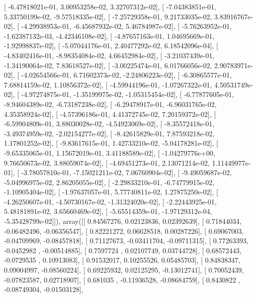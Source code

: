 \documentclass{article}
\begin{document}
       [ -6.47818021e-01,   3.00953258e-02,   3.32707312e-02],
       [ -7.04383851e-01,   5.33750199e-02,  -9.57518335e-02],
       [ -7.25729358e-01,   9.21733035e-02,   3.83916767e-02],
       [ -4.29938953e-01,  -6.45687932e-02,   5.46784987e-02],
       [ -5.76263952e-01,  -1.62387132e-03,  -4.42346108e-02],
       [ -4.87657163e-01,   1.04695669e-01,  -1.92998837e-02],
       [ -5.07044176e-01,   2.40477292e-02,   6.18542096e-04],
       [ -4.83402416e-01,  -8.98354084e-02,   4.66452984e-02],
       [ -3.21037439e-01,  -1.34190064e-02,   7.83618527e-02],
       [ -3.00225474e-01,   6.01766056e-02,   2.90783971e-02],
       [ -4.02654566e-01,   6.71602373e-02,  -2.24806223e-02],
       [ -6.30865577e-01,   7.68814159e-02,   1.10856372e-02],
       [ -4.59944196e-01,  -1.07267322e-01,   4.50531749e-02],
       [ -4.97274875e-01,  -1.35199975e-02,  -1.05315454e-02],
       [ -6.77877605e-01,  -8.94604389e-02,  -6.73187238e-02],
       [ -6.29478917e-01,  -6.96031765e-02,   4.35358924e-02],
       [ -4.57396186e-01,   4.41372745e-02,   7.20159372e-02],
       [ -6.59904809e-01,   3.88030028e-02,  -4.54923069e-02],
       [ -8.35572418e-01,  -3.49374959e-02,  -2.02154277e-02],
       [ -8.42615829e-01,   7.87593218e-02,   1.17801252e-02],
       [ -9.83617615e-01,   1.42733210e-02,  -5.04178281e-02],
       [ -9.65335065e-01,   1.15672019e-01,   3.41188589e-02],
       [ -1.04279776e+00,   9.76650673e-02,   3.88059074e-02],
       [ -4.69451273e-01,   2.13071214e-02,   1.11449977e-01],
       [ -3.78057810e-01,  -7.15021211e-02,   7.06760904e-02],
       [ -9.49059687e-02,  -5.04996975e-02,   2.86205055e-02],
       [ -2.29833210e-01,  -6.74779915e-02,  -1.10905404e-02],
       [ -1.97637057e-01,   5.77740811e-02,   1.27875250e-02],
       [ -4.26250607e-01,  -4.50730167e-02,  -1.31324020e-02],
       [ -2.22443925e-01,   5.48181891e-02,   3.65660469e-02],
       [ -5.65514359e-01,  -1.97129312e-04,  -5.35428799e-02]]), array([[ 0.84567276,  0.02123836,  0.02392639],
       [ 0.71844034, -0.06482496, -0.06356547],
       [ 0.82221272,  0.06628518,  0.00287226],
       [ 0.69067003, -0.04709969, -0.08457818],
       [ 0.71127673, -0.03411704, -0.09711315],
       [ 0.77263393, -0.0452982 , -0.00514885],
       [ 0.7597724 ,  0.02107749,  0.03744728],
       [ 0.68572443, -0.0729535 ,  0.10913083],
       [ 0.91532017,  0.10255526,  0.05485703],
       [ 0.84838347,  0.09004997, -0.08560224],
       [ 0.69225932,  0.02125295, -0.13012741],
       [ 0.70052439, -0.07823587,  0.02718907],
       [ 0.681035  , -0.11936528, -0.08684759],
       [ 0.8430822 , -0.08749304, -0.01503128],
\end{document}
